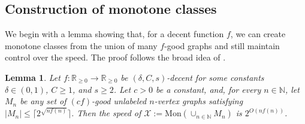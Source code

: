 \documentclass[letterpaper,11pt]{article}
\newcommand{\dec}{decent\xspace}
\newcommand{\Nn}{\mathbb{N}}
\newcommand{\Rrr}{\mathbb{R}_{\geq 0}}
\newcommand{\Xc}{\mathcal{X}}
\newtheorem{lemma}[theorem]{Lemma}
\theoremstyle{definition}
\theoremstyle{remark}
\newcommand{\mon}{\mathrm{Mon}}
\renewcommand{\leq}{\leqslant}
\renewcommand{\geq}{\geqslant}
\begin{document}
 
 	\subsection{Construction of monotone classes}
 	\label{sec:general-framework}
 We begin with a lemma showing that, for a decent function $f$, we can create monotone classes from the union of many $f$-good graphs and still maintain control over the speed. The proof follows the broad idea of \cite[Claim 3.1]{HH22}.
 
 	
 	\begin{lemma}\label{lem:good-tiny} 
			Let $f : \Rrr \rightarrow \Rrr$ be $(\delta,C,s)$-\dec  for some constants $\delta \in (0,1)$, $C\geq 1$, and $s\geq 2$.  
		Let $c > 0$ be a constant, and, for every $n \in \Nn$, let $M_n$ be any set of $(cf)$-good unlabeled $n$-vertex graphs satisfying 
		$|M_n| \leq  \big\lceil 2^{\sqrt{nf(n)}} \big\rceil$.
 		Then the speed of $\Xc := \mon(\cup_{n \in \Nn} M_n)$ is $2^{O(nf(n))}$.
 	\end{lemma}
\end{document}
